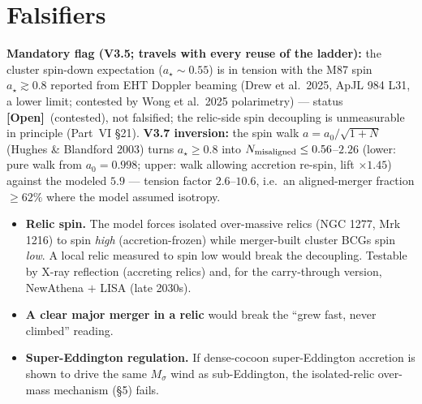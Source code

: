 \documentclass[11pt]{article}
\newcommand{\open}{\textcolor{red!70!black}{\textbf{[Open]}}}
\newcommand{\Msig}{M_\sigma}
\begin{document}
\section{Falsifiers}
\noindent\textbf{Mandatory flag (V3.5; travels with every reuse of the ladder):} the cluster spin-down expectation ($a_\star\sim0.55$) is in tension with the M87 spin $a_\star\gtrsim0.8$ reported from EHT Doppler beaming (Drew et al.\ 2025, ApJL 984 L31, a lower limit; contested by Wong et al.\ 2025 polarimetry) --- status \open\ (contested), not falsified; the relic-side spin decoupling is unmeasurable in principle (Part~VI \S21). \textbf{V3.7 inversion:} the spin walk $a=a_0/\sqrt{1+N}$ (Hughes \& Blandford 2003) turns $a_\star\ge0.8$ into $N_{\rm misaligned}\le0.56$--$2.26$ (lower: pure walk from $a_0=0.998$; upper: walk allowing accretion re-spin, lift $\times1.45$) against the modeled $5.9$ --- tension factor $2.6$--$10.6$, i.e.\ an aligned-merger fraction $\ge62\%$ where the model assumed isotropy.
\begin{itemize}[leftmargin=1.3em,itemsep=2pt]
\item \textbf{Relic spin.} The model forces isolated over-massive relics (NGC 1277, Mrk 1216) to spin \emph{high} (accretion-frozen) while merger-built cluster BCGs spin \emph{low}. A local relic measured to spin low would break the decoupling. Testable by X-ray reflection (accreting relics) and, for the carry-through version, NewAthena $+$ LISA (late 2030s).
\item \textbf{A clear major merger in a relic} would break the ``grew fast, never climbed'' reading.
\item \textbf{Super-Eddington regulation.} If dense-cocoon super-Eddington accretion is shown to drive the same $\Msig$ wind as sub-Eddington, the isolated-relic over-mass mechanism (\S5) fails.
\end{itemize}

\end{document}
